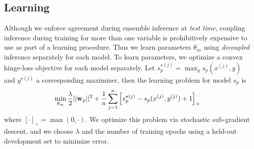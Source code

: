 \subsection{Learning} Although we enforce agreement during ensemble inference 
at {\em test time}, coupling inference during training for more than one 
variable is prohibitively expensive to use as part of a learning procedure.  
Thus we learn
parameters $\theta_m$ using {\em decoupled} inference separately for
each model. To learn parameters, we optimize a convex hinge-loss
objective for each model separately. Let $s_p^{\star (j)} = \max_y 
s_p(x^{(j)},y)$ and $y^{\star(j)}$ a corresponding maximizer, then the learning 
problem for model $s_p$ is \begin{align}
\min_{\theta_m} \frac{\lambda}{2}||\mathbf{w}_p||^2 +
\frac{1}{n}\sum_{j=1}^n \left[ s_p^{\star (j)} - s_p(x^{(j)},y^{(j)})
+1\right]_+
\end{align}
where $[\cdot]_+ = \max(0,\cdot)$.
We optimize
this problem via stochastic sub-gradient descent, and we choose
$\lambda$ and the number of training epochs using a held-out
development set to minimize error.



